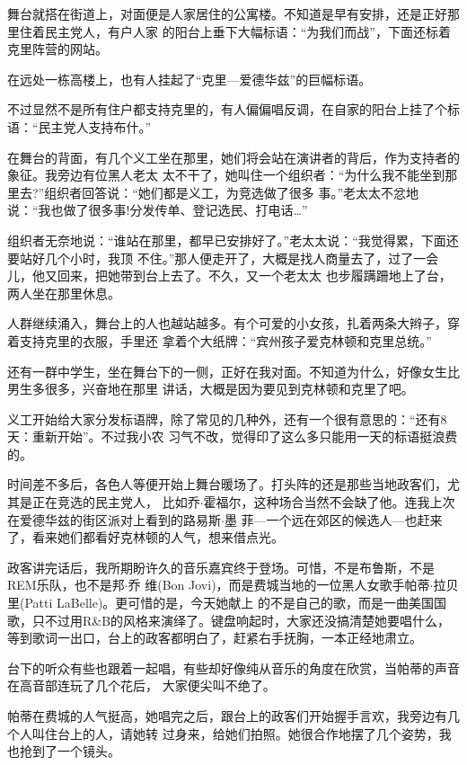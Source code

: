 ﻿\documentclass[11pt]{article}
\begin{document}
舞台就搭在街道上，对面便是人家居住的公寓楼。不知道是早有安排，还是正好那里住着民主党人，有户人家
的阳台上垂下大幅标语：``为我们而战''，下面还标着克里阵营的网站。

在远处一栋高楼上，也有人挂起了``克里---爱德华兹''的巨幅标语。

不过显然不是所有住户都支持克里的，有人偏偏唱反调，在自家的阳台上挂了个标语：``民主党人支持布什。''

在舞台的背面，有几个义工坐在那里，她们将会站在演讲者的背后，作为支持者的象征。我旁边有位黑人老太
太不干了，她叫住一个组织者：``为什么我不能坐到那里去?''组织者回答说：``她们都是义工，为竞选做了很多
事。''老太太不忿地说：``我也做了很多事!分发传单、登记选民、打电话\ldots ''

组织者无奈地说：``谁站在那里，都早已安排好了。''老太太说：``我觉得累，下面还要站好几个小时，我顶
不住。''那人便走开了，大概是找人商量去了，过了一会儿，他又回来，把她带到台上去了。不久，又一个老太太
也步履蹒跚地上了台，两人坐在那里休息。

人群继续涌入，舞台上的人也越站越多。有个可爱的小女孩，扎着两条大辫子，穿着支持克里的衣服，手里还
拿着个大纸牌：``宾州孩子爱克林顿和克里总统。''

还有一群中学生，坐在舞台下的一侧，正好在我对面。不知道为什么，好像女生比男生多很多，兴奋地在那里
讲话，大概是因为要见到克林顿和克里了吧。

义工开始给大家分发标语牌，除了常见的几种外，还有一个很有意思的：``还有8天：重新开始''。不过我小农
习气不改，觉得印了这么多只能用一天的标语挺浪费的。

时间差不多后，各色人等便开始上舞台暖场了。打头阵的还是那些当地政客们，尤其是正在竞选的民主党人，
比如乔$\cdot$霍福尔，这种场合当然不会缺了他。连我上次在爱德华兹的街区派对上看到的路易斯$\cdot$墨
菲---一个远在郊区的候选人---也赶来了，看来她们都看好克林顿的人气，想来借点光。

政客讲完话后，我所期盼许久的音乐嘉宾终于登场。可惜，不是布鲁斯，不是REM乐队，也不是邦$\cdot$乔
维(Bon Jovi)，而是费城当地的一位黑人女歌手帕蒂$\cdot$拉贝里(Patti LaBelle)。更可惜的是，今天她献上
的不是自己的歌，而是一曲美国国歌，只不过用R\&B的风格来演绎了。键盘响起时，大家还没搞清楚她要唱什么，
等到歌词一出口，台上的政客都明白了，赶紧右手抚胸，一本正经地肃立。


台下的听众有些也跟着一起唱，有些却好像纯从音乐的角度在欣赏，当帕蒂的声音在高音部连玩了几个花后，
大家便尖叫不绝了。

帕蒂在费城的人气挺高，她唱完之后，跟台上的政客们开始握手言欢，我旁边有几个人叫住台上的人，请她转
过身来，给她们拍照。她很合作地摆了几个姿势，我也抢到了一个镜头。
\end{document}
